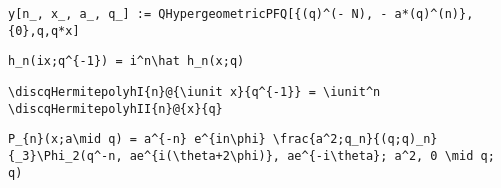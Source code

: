 \newsavebox\DJMM
\begin{lrbox}{\DJMM}
 \begin{minipage}[t]{0.82\textwidth}
  \lstinline[language={[latex]TeX},mathescape,breaklines=true]"y[n_, x_, a_, q_] := QHypergeometricPFQ[{(q)^(- N), - a*(q)^(n)},{0},q,q*x]"
 \end{minipage}
\end{lrbox}
\newsavebox\DJMA
\begin{lrbox}{\DJMA}
 \begin{minipage}[t]{0.82\textwidth}
  \lstinline[language={[latex]TeX},mathescape,breaklines=true]""
 \end{minipage}
\end{lrbox}
\newsavebox\DKT
\begin{lrbox}{\DKT}
 \begin{minipage}[t]{0.82\textwidth}
  \lstinline[language={[latex]TeX},mathescape,breaklines=true]"h_n(ix;q^{-1}) = i^n\hat h_n(x;q)"
 \end{minipage}
\end{lrbox}
\newsavebox\DKST
\begin{lrbox}{\DKST}
 \begin{minipage}[t]{0.82\textwidth}
  \lstinline[language={[latex]TeX},mathescape,breaklines=true]"\discqHermitepolyhI{n}@{\iunit x}{q^{-1}} = \iunit^n \discqHermitepolyhII{n}@{x}{q}"
 \end{minipage}
\end{lrbox}
\newsavebox\DKMM
\begin{lrbox}{\DKMM}
 \begin{minipage}[t]{0.82\textwidth}
  \lstinline[language={[latex]TeX},mathescape,breaklines=true]""
 \end{minipage}
\end{lrbox}
\newsavebox\DKMA
\begin{lrbox}{\DKMA}
 \begin{minipage}[t]{0.82\textwidth}
  \lstinline[language={[latex]TeX},mathescape,breaklines=true]""
 \end{minipage}
\end{lrbox}
\newsavebox\DLT
\begin{lrbox}{\DLT}
 \begin{minipage}[t]{0.82\textwidth}
  \lstinline[language={[latex]TeX},mathescape,breaklines=true]"P_{n}(x;a\mid q) = a^{-n} e^{in\phi} \frac{a^2;q_n}{(q;q)_n} {_3}\Phi_2(q^-n, ae^{i(\theta+2\phi)}, ae^{-i\theta}; a^2, 0 \mid q; q)"
 \end{minipage}
\end{lrbox}
